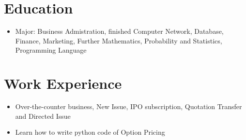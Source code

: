 \documentclass{resume}
\newcommand{\en}[1]{#1}
\newcommand{\zh}[1]{}
\begin{document}
\name{\en{Qinyang Huang}\zh{黄沁洋}}


\section{\en{Education}\zh{教育经历}}
\en{}
\vspace{2 mm}
\zh{\datedsubsection{\textbf{\href{http://www.usst.edu.cn/main.htm}{上海理工大学}}, 本科}{2018/09 -- 2022/06}}
\begin{itemize}
      \item \en{Major: Business Admistration, finished Computer Network, Database, Finance, Marketing, Further Mathematics, Probability and Statistics, Programming Language}
            \zh{工商管理，完成计算机网络、数据库、金融、高等数学}
\end{itemize}
\vspace{2 mm}


\section{\en{Work Experience}\zh{工作经历}}
\en{}
\zh{\datedsubsection{\textbf{\href{https://zdb.pedaily.cn/enterprise/show102413/}{悬铃资产管理有限公司}}}{12/2021 -- Present}}
\vspace{2 mm}

\en{}
\zh{\role{全职}{投资组}}
\vspace{2 mm}

\begin{itemize}
      \item \en{Over-the-counter business, New Issue, IPO subscription, Quotation Transfer and Directed Issue}
            \zh{场外业务,打新,新股申购,询价转让,定向增发}
      \item \en{Learn how to write python code of Option Pricing}
            \zh{学习如何编写期权定价的python代码}
\end{itemize}

\vspace{2 mm}
\end{document}
